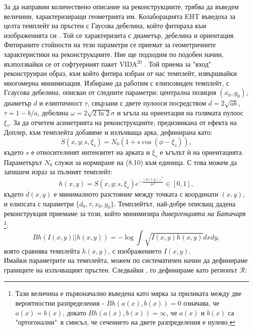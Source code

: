 За да направим количествено описание на реконструкциите, трябва да въведем величини, характеризиращи геометрията им. Колаборацията EHT въведоха за целта темплейт на пръстен с Гаусова дебелина, който фитираха към изображенията си \cite{EHT_M87_VI}. Той се характеризита с диаметър, дебелина и ориентация. Фитираните стойности на тези параметри се приемат за геометричните характеристики на реконструкциите. Ние ще подходим по подобен начин, възползвайки се от софтуерният пакет VIDA$^{20}$ \cite{VIDA}. Той приема за "вход"$\,$ реконструиран образ, към който фитира избран от нас темплейт, извършвайки многомерна минимизация. Избираме да работим с елипсовиден темплейт, с Гсаусова дебелина, описван от следните параметри: централна позиция $(x_0,y_0)$, диаметър $d$ и елиптичност $\tau$, свързани с двете пулооси посредством $d = 2\sqrt{ab}$, $\tau = 1 - b/a$, дебелина $\mathcal{\omega} = 2\sqrt{2\ln2}\sigma$ и ъгъла на ориентация на голямата пулоос $\xi_\tau$. За да отчетем асиметрията на реконструкциите, предизвикана от ефекта на Доплер, към темплейта добавяме и излъчваща арка, дефинирана като:
\begin{equation}
	S(x,y;s,\xi_s) = N_0(1 + s\cos(\phi - \xi_s)),
\end{equation}
където $s$ е относителният интензитет на арката и $\xi_s$ е ъгълът ѝ на ориентацията. Параметърът $N_0$ служи за нормиране на (8.10) към единица. С това можем да запишем израз за пълният темплейт:
\begin{equation}
	h(x,y) = S(x,y;s,\xi_s)e^{-\frac{(d(x,y))^2}{2\sigma^2}}\in[0,1],
\end{equation}
където $d(x,y)$ е минималното разстояние между точката с координати $(x,y)$, и елипсата с параметри $\{d_0,\tau,x_0,y_0\}$. Темплейтът, най-добре описващ дадена реконструкция приемаме за този, който минимизира \emph{дивергенцията на Батачаря} \footnote{Тази величина е първоначално въведена като мярка за приликата между две вероятностни разпределения - $Bh(a(x),b(x)) = 0$ означава, че $a(x) = b(x)$, докато $Bh(a(x), b(x)) = \infty$, че $a(x)$ и $b(x)$ са "ортогонални"$\,$ в смисъл, че сечението на двете разпределения е нулево.}:
\begin{equation}
	Bh\left(I(x,y)||h(x,y)\right)= -\log\int\sqrt{I(x,y)h(x,y)}dxdy,
\end{equation}
която сравнява темплейта $h(x,y)$, с изображението $I(x,y)$.\\

Имайки параметрите на темплейта, можем по систематичен начин да дефинираме границите на излъчващият пръстен. Следвайки \cite{Eichhorn2022}, го дефинираме като регионът $\mathcal{R}$:


